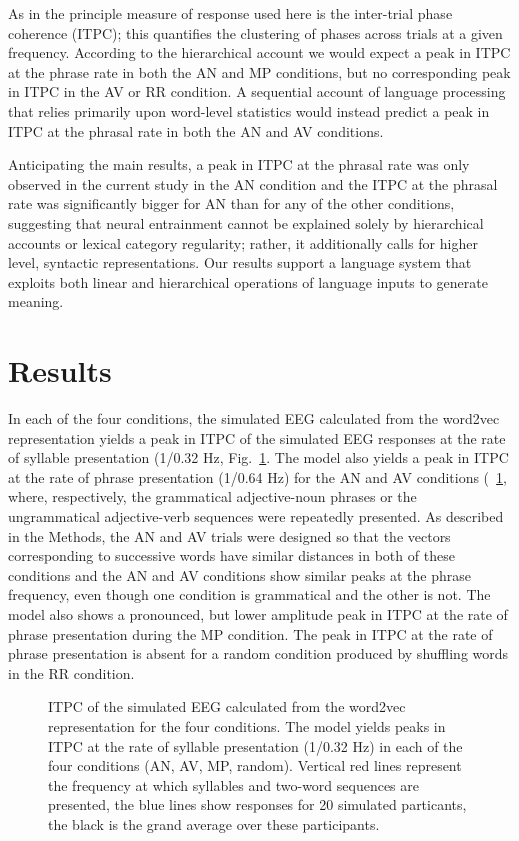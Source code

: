 \documentclass[10pt,letterpaper]{article}
\begin{document}
As in \cite{DingEtAl2017} the principle measure of response used here
is the inter-trial phase coherence (ITPC); this quantifies the
clustering of phases across trials at a given frequency. According to
the hierarchical account we would expect a peak in ITPC at the phrase
rate in both the AN and MP conditions, but no corresponding peak in
ITPC in the AV or RR condition. A sequential account of language
processing that relies primarily upon word-level statistics would
instead predict a peak in ITPC at the phrasal rate in both the AN and
AV conditions.

Anticipating the main results, a peak in ITPC at the phrasal rate was
only observed in the current study in the AN condition and the ITPC at
the phrasal rate was significantly bigger for AN than for any of the
other conditions, suggesting that neural entrainment cannot be
explained solely by hierarchical accounts or lexical category
regularity; rather, it additionally calls for higher level, syntactic
representations. Our results support a language system that exploits
both linear and hierarchical operations of language inputs to generate
meaning.


\section*{Results}
In each of the four conditions, the simulated EEG calculated from the
word2vec representation yields a peak in ITPC of the simulated EEG
responses at the rate of syllable presentation (1/0.32 Hz,
Fig.~\ref{fig:Fig1}. The model also yields a peak in ITPC at the rate
of phrase presentation (1/0.64 Hz) for the AN and AV conditions
(~\ref{fig:Fig1}, where, respectively, the grammatical adjective-noun
phrases or the ungrammatical adjective-verb sequences were repeatedly
presented. As described in the Methods, the AN and AV trials were
designed so that the vectors corresponding to successive words have
similar distances in both of these conditions and the AN and AV
conditions show similar peaks at the phrase frequency, even though one
condition is grammatical and the other is not. The model also shows a
pronounced, but lower amplitude peak in ITPC at the rate of phrase
presentation during the MP condition. The peak in ITPC at the rate of
phrase presentation is absent for a random condition produced by
shuffling words in the RR condition.


 \begin{figure}[tbhp]

\caption{ITPC of the simulated EEG calculated from the word2vec
  representation for the four conditions. The model yields peaks in
  ITPC at the rate of syllable presentation (1/0.32 Hz) in each of the
  four conditions (AN, AV, MP, random). Vertical red lines represent
  the frequency at which syllables and two-word sequences are
  presented, the blue lines show responses for 20 simulated
  particants, the black is the grand average over these participants.
}
\label{fig:Fig1}
\end{figure}
\end{document}
